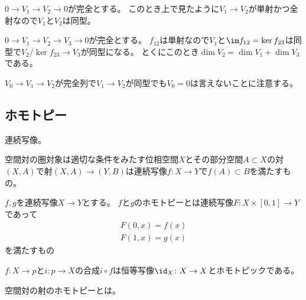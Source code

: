 \documentclass{jsarticle}
\begin{document}
\begin{eg}
$0\to V_1\to V_2\to 0$が完全とする。
このとき上で見たように$V_1\to V_2$が単射かつ全射なので$V_1$と$V_2$は同型。
\end{eg}

\begin{eg}
$0\to V_1\to V_2\to V_3\to 0$が完全とする。
$f_{12}$は単射なので$V_1$と$\im f_{12}=\ker f_{23}$は同型で$V_2/\ker f_{23}\to V_3$が同型になる。
とくにこのとき$\dim V_2=\dim V_1+\dim V_3$である。
\end{eg}

$V_0\to V_1\to V_2$が完全列で$V_1\to V_2$が同型でも$V_0=0$は言えないことに注意する。

\subsection{ホモトピー}
連続写像。

空間対の圏対象は適切な条件をみたす位相空間$X$とその部分空間$A\subset X$の対$(X,A)$で射$(X,A)\to (Y,B)$は連続写像$f\colon X\to Y$で$f(A)\subset B$を満たすもの。

\begin{dfn}[ホモトピー]
$f, g$を連続写像$X\to Y$とする。
$f$と$g$のホモトピーとは連続写像$F\colon X\times [0,1]\to Y$であって
\begin{align*}
F(0,x)=f(x)\\
F(1,x)=g(x)
\end{align*}
を満たすもの
\end{dfn}

\begin{eg}
$f\colon X\to p$と$i\colon p\to X$の合成$i\circ f$は恒等写像$\id_X\colon X\to X$とホモトピックである。
\end{eg}

空間対の射のホモトピーとは。
\end{document}
